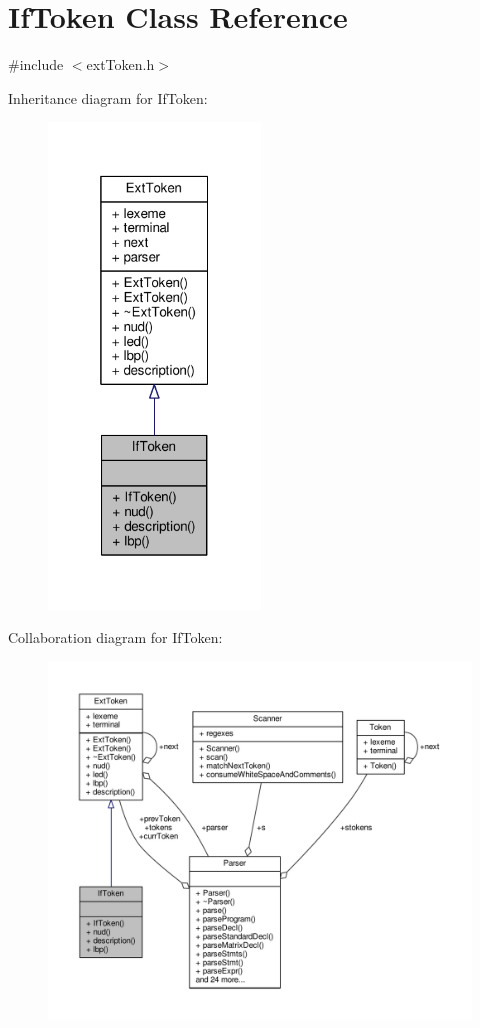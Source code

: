 \hypertarget{classIfToken}{\section{If\-Token Class Reference}
\label{classIfToken}
}


{\ttfamily \#include $<$ext\-Token.\-h$>$}



Inheritance diagram for If\-Token\-:\nopagebreak
\begin{figure}[H]
\begin{center}
\leavevmode
\includegraphics[width=160pt]{classIfToken__inherit__graph}
\end{center}
\end{figure}


Collaboration diagram for If\-Token\-:\nopagebreak
\begin{figure}[H]
\begin{center}
\leavevmode
\includegraphics[width=350pt]{classIfToken__coll__graph}
\end{center}
\end{figure}
